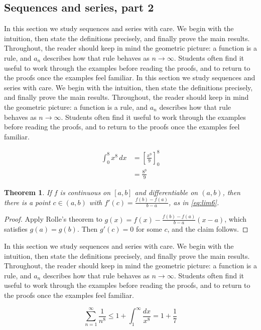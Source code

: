 \documentclass[11pt]{article}
\newtheorem{theorem}{Theorem}[section]
\begin{document}
\subsection{Sequences and series, part 2}

In this section we study sequences and series with care. We begin with the intuition, then state the definitions precisely, and finally prove the main results. Throughout, the reader should keep in mind the geometric picture: a function is a rule, and $a_n$ describes how that rule behaves as $n \to \infty$. Students often find it useful to work through the examples before reading the proofs, and to return to the proofs once the examples feel familiar. In this section we study sequences and series with care. We begin with the intuition, then state the definitions precisely, and finally prove the main results. Throughout, the reader should keep in mind the geometric picture: a function is a rule, and $a_n$ describes how that rule behaves as $n \to \infty$. Students often find it useful to work through the examples before reading the proofs, and to return to the proofs once the examples feel familiar. 

\begin{align}
  \int_0^{8} x^{8}\,dx &= \left[ \frac{x^{9}}{9} \right]_0^{8} \\
  &= \frac{8^{9}}{9} \label{eq:int6}
\end{align}

\begin{theorem}
If $f$ is continuous on $[a,b]$ and differentiable on $(a,b)$, then there is a point $c \in (a,b)$ with $f'(c) = \frac{f(b)-f(a)}{b-a}$, as in \eqref{eq:lim6}.
\end{theorem}

\begin{proof}
Apply Rolle's theorem to $g(x) = f(x) - \frac{f(b)-f(a)}{b-a}(x-a)$, which satisfies $g(a) = g(b)$. Then $g'(c) = 0$ for some $c$, and the claim follows.
\end{proof}

In this section we study sequences and series with care. We begin with the intuition, then state the definitions precisely, and finally prove the main results. Throughout, the reader should keep in mind the geometric picture: a function is a rule, and $a_n$ describes how that rule behaves as $n \to \infty$. Students often find it useful to work through the examples before reading the proofs, and to return to the proofs once the examples feel familiar. 

\[
  \sum_{n=1}^{\infty} \frac{1}{n^{8}} \le 1 + \int_1^{\infty} \frac{dx}{x^{8}} = 1 + \frac{1}{7}
\]
\end{document}

